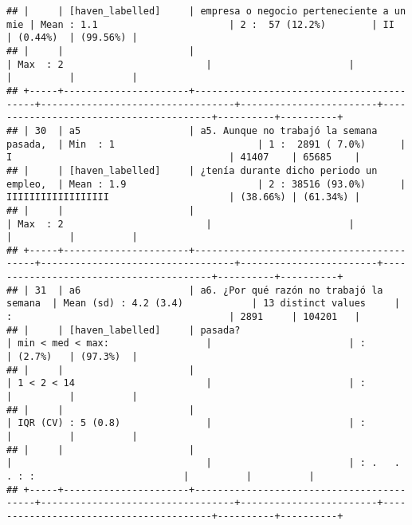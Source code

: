 \documentclass[]{article}
\begin{document}
\begin{verbatim}
## |     | [haven_labelled]     | empresa o negocio perteneciente a un mie | Mean : 1.1                       | 2 :  57 (12.2%)        | II                                     | (0.44%)  | (99.56%) |
## |     |                      |                                          | Max  : 2                         |                        |                                        |          |          |
## +-----+----------------------+------------------------------------------+----------------------------------+------------------------+----------------------------------------+----------+----------+
## | 30  | a5                   | a5. Aunque no trabajó la semana pasada,  | Min  : 1                         | 1 :  2891 ( 7.0%)      | I                                      | 41407    | 65685    |
## |     | [haven_labelled]     | ¿tenía durante dicho periodo un empleo,  | Mean : 1.9                       | 2 : 38516 (93.0%)      | IIIIIIIIIIIIIIIIII                     | (38.66%) | (61.34%) |
## |     |                      |                                          | Max  : 2                         |                        |                                        |          |          |
## +-----+----------------------+------------------------------------------+----------------------------------+------------------------+----------------------------------------+----------+----------+
## | 31  | a6                   | a6. ¿Por qué razón no trabajó la semana  | Mean (sd) : 4.2 (3.4)            | 13 distinct values     | :                                      | 2891     | 104201   |
## |     | [haven_labelled]     | pasada?                                  | min < med < max:                 |                        | :                                      | (2.7%)   | (97.3%)  |
## |     |                      |                                          | 1 < 2 < 14                       |                        | :                                      |          |          |
## |     |                      |                                          | IQR (CV) : 5 (0.8)               |                        | :                                      |          |          |
## |     |                      |                                          |                                  |                        | : .   . . : :                          |          |          |
## +-----+----------------------+------------------------------------------+----------------------------------+------------------------+----------------------------------------+----------+----------+

\end{verbatim}
\end{document}
